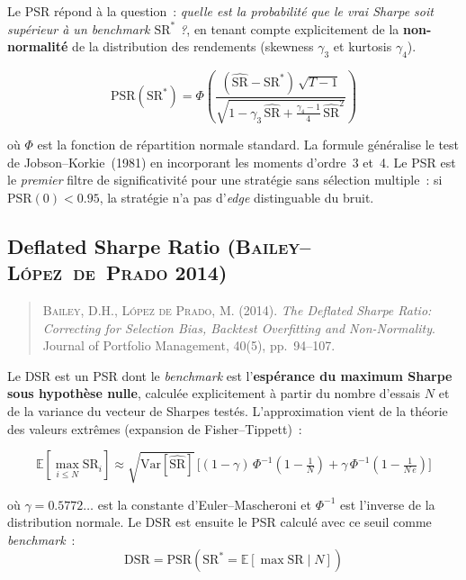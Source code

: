 Le PSR répond à la question~: \emph{quelle est la probabilité que le vrai Sharpe soit supérieur à un benchmark $\mathrm{SR}^{*}$ ?}, en tenant compte explicitement de la \textbf{non-normalité} de la distribution des rendements (skewness $\gamma_{3}$ et kurtosis $\gamma_{4}$).

\begin{equation}
\mathrm{PSR}(\mathrm{SR}^{*}) = \Phi\!\left(
\frac{(\widehat{\mathrm{SR}} - \mathrm{SR}^{*})\,\sqrt{T - 1}}
{\sqrt{1 - \gamma_{3}\,\widehat{\mathrm{SR}} + \frac{\gamma_{4} - 1}{4}\,\widehat{\mathrm{SR}}^{2}}}
\right)
\label{eq:psr}
\end{equation}

où $\Phi$ est la fonction de répartition normale standard. La formule généralise le test de Jobson--Korkie~(1981) en incorporant les moments d'ordre~3 et~4. Le PSR est le \emph{premier} filtre de significativité pour une stratégie sans sélection multiple~: si PSR$(0) < 0.95$, la stratégie n'a pas d'\emph{edge} distinguable du bruit.

\subsection{Deflated Sharpe Ratio (\textsc{Bailey--L\'opez~de~Prado} 2014)}
\label{app:dsr}

\begin{quote}\small
\textsc{Bailey}, D.H., \textsc{L\'opez de Prado}, M. (2014). \emph{The Deflated Sharpe Ratio: Correcting for Selection Bias, Backtest Overfitting and Non-Normality}. Journal of Portfolio Management, 40(5), pp.~94--107.
\end{quote}

Le DSR est un PSR dont le \emph{benchmark} est l'\textbf{espérance du maximum Sharpe sous hypothèse nulle}, calculée explicitement à partir du nombre d'essais $N$ et de la variance du vecteur de Sharpes testés. L'approximation vient de la théorie des valeurs extrêmes (expansion de Fisher--Tippett)~:

\begin{equation}
\mathbb{E}\!\left[\max_{i \leq N} \mathrm{SR}_{i}\right]
\approx \sqrt{\mathrm{Var}[\widehat{\mathrm{SR}}]} \,\Big[
(1 - \gamma)\,\Phi^{-1}\!\left(1 - \tfrac{1}{N}\right)
+ \gamma\,\Phi^{-1}\!\left(1 - \tfrac{1}{N\,e}\right)
\Big]
\label{eq:expected_max_sharpe}
\end{equation}

où $\gamma = 0.5772\ldots$ est la constante d'Euler--Mascheroni et $\Phi^{-1}$ est l'inverse de la distribution normale. Le DSR est ensuite le PSR calculé avec ce seuil comme \emph{benchmark}~:
\begin{equation}
\mathrm{DSR} = \mathrm{PSR}\!\left(\mathrm{SR}^{*} = \mathbb{E}[\max \mathrm{SR}\mid N]\right)
\label{eq:dsr}
\end{equation}

